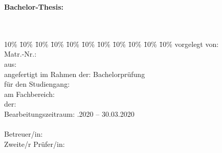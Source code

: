 \begin{titlepage}
  \begin{center}
  \textbf{Bachelor-Thesis:}\\
  \Huge{\myTitel}\\
  \LARGE{\mySubtitel}\\
  \vspace{0.2cm}
  \end{center}
  \normalsize
  \vfill
  \begin{tabbing}
    10\% \= 10\% \= 10\% \= 10\% \= 10\% \= 10\% \= 10\% \= 10\% \= 10\% \= 10\% \= 10\% \kill
    vorgelegt von: \> \> \> \> \> \> \> \> \> \> \myAutor\\
    Matr.-Nr.: \> \> \> \> \> \> \> \> \> \> \myMatrikelNr\\
    aus: \> \> \> \> \> \> \> \> \> \> \myLocation\\
    angefertigt im Rahmen der: \> \> \> \> \> \> \> \> \> \>  Bachelorprüfung\\%
    für den Studiengang: \> \> \> \> \> \> \> \> \> \> \myStudiengang \\%
    am Fachbereich: \> \> \> \> \> \> \> \> \> \> \myFachbereich\\
    der:  \> \> \> \> \> \> \> \> \> \> \myHochschulName \\
    Bearbeitungszeitraum: \> \> \> \> \> \> \> \> \> .2020 -- 30.03.2020 \\
    \\
    Betreuer/in: \> \> \> \> \> \> \> \> \> \> \myBetreuer\\
    Zweite/r Prüfer/in: \> \> \> \> \> \> \> \> \> \> \myZweitpruefer\\
  \end{tabbing}
\end{titlepage}
